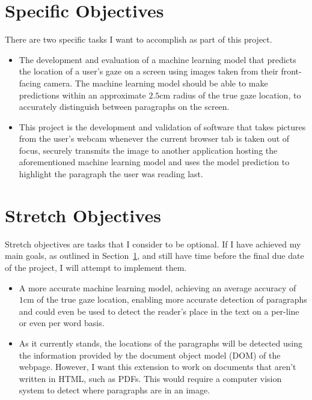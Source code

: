\documentclass[twocolumn]{report}
\begin{document}
\section{Specific Objectives}\label{sec:specific-objectives}

There are two specific tasks I want to accomplish as part of this project.

\begin{itemize}
    \item The development and evaluation of a machine learning model that predicts the location of a user's gaze on a screen using images taken from their front-facing camera. The machine learning model should be able to make predictions within an approximate $2.5\text{cm}$ radius of the true gaze location, to accurately distinguish between paragraphs on the screen.
    \item This project is the development and validation of software that takes pictures from the user's webcam whenever the current browser tab is taken out of focus, securely transmits the image to another application hosting the aforementioned machine learning model and uses the model prediction to highlight the paragraph the user was reading last.
\end{itemize}

\section{Stretch Objectives}

Stretch objectives are tasks that I consider to be optional. If I have achieved my main goals, as outlined in Section~\ref{sec:specific-objectives}, and still have time before the final due date of the project, I will attempt to implement them.

\begin{itemize}
    \item A more accurate machine learning model, achieving an average accuracy of \(1\text{cm}\) of the true gaze location, enabling more accurate detection of paragraphs and could even be used to detect the reader's place in the text on a per-line or even per word basis.

    \item As it currently stands, the locations of the paragraphs will be detected using the information provided by the document object model (DOM) of the webpage. However, I want this extension to work on documents that aren't written in HTML, such as PDFs. This would require a computer vision system to detect where paragraphs are in an image.
\end{itemize}
\end{document}
